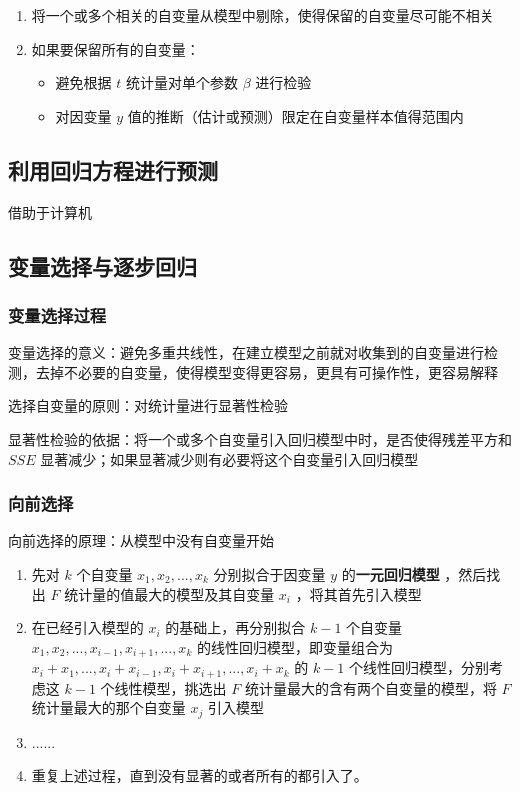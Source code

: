 \documentclass[UTF8,10pt]{book}
\begin{document}
{\begin{enumerate}
	\def\labelenumi{\arabic{enumi}.}
	\item
	将一个或多个相关的自变量从模型中剔除，使得保留的自变量尽可能不相关
	\item
	如果要保留所有的自变量：
	
	\begin{itemize}
		\item
		避免根据 \(t\) 统计量对单个参数 \(\beta\) 进行检验
		\item
		对因变量 \(y\) 值的推断（估计或预测）限定在自变量样本值得范围内
	\end{itemize}
\end{enumerate}

\subsection{利用回归方程进行预测}\label{header-n282}

借助于计算机

\clearpage
\subsection{变量选择与逐步回归}\label{header-n284}

\subsubsection{变量选择过程}\label{header-n285}

变量选择的意义：避免多重共线性，在建立模型之前就对收集到的自变量进行检测，去掉不必要的自变量，使得模型变得更容易，更具有可操作性，更容易解释

选择自变量的原则：对统计量进行显著性检验

显著性检验的依据：将一个或多个自变量引入回归模型中时，是否使得残差平方和
\(SSE\) 显著减少；如果显著减少则有必要将这个自变量引入回归模型

\subsubsection{向前选择}\label{header-n289}

向前选择的原理：从模型中没有自变量开始

\begin{enumerate}
	\def\labelenumi{\arabic{enumi}.}
	\item
	先对 \(k\) 个自变量 \( x_1,x_2,...,x_k\) 分别拟合于因变量 \(y\)
	的\textbf{一元回归模型} ，然后找出 \(F\)
	统计量的值最大的模型及其自变量 \(x_i\) ，将其首先引入模型
	\item
	在已经引入模型的 \(x_i\) 的基础上，再分别拟合 \(k-1\) 个自变量
	\( x_1,x_2,...,x_{i-1},x_{i+1},...,x_{k}\)
	的线性回归模型，即变量组合为
	\(x_i + x_1,...,x_i + x_{i-1},x_i + x_{i+1},...,x_i + x_{k}\) 的
	\(k-1\) 个线性回归模型，分别考虑这 \(k-1\) 个线性模型，挑选出 \(F\)
	统计量最大的含有两个自变量的模型，将 \(F\) 统计量最大的那个自变量
	\(x_j \) 引入模型
	\item
	......
	\item
	重复上述过程，直到没有显著的或者所有的都引入了。
\end{enumerate}

}
\end{document}
